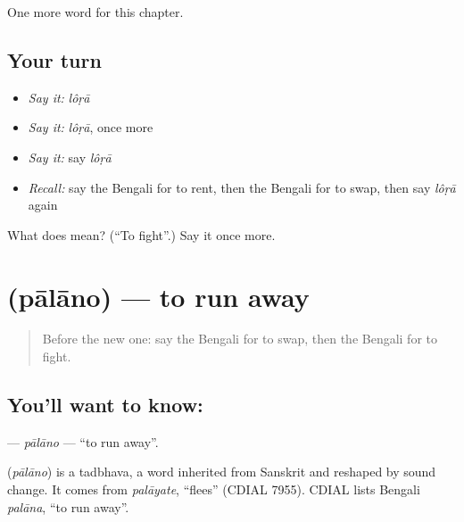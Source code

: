 \begin{grammarlens}[title={What you've built}]
One more word for this chapter.
\end{grammarlens}

\subsection*{Your turn}
\begin{itemize}
\raggedright
  \item \emph{Say it:} \emph{lôṛā}
  \item \emph{Say it:} \emph{lôṛā}, once more
  \item \emph{Say it:} say \emph{lôṛā}
  \item \emph{Recall:} say the Bengali for to rent, then the Bengali for to swap, then say \emph{lôṛā} again
\end{itemize}

\begin{tcolorbox}[breakable,colback=teal!4,colframe=teal!35!black,title={Before you move on}]
What does  mean? (\textquotedblleft{}To fight\textquotedblright{}.) Say it once more.
\end{tcolorbox}
\section[\texorpdfstring{\bn{পালানো} (pālāno)}{পালানো (pālāno)}]{ (pālāno) — to run away}

\label{lesson:BN-C212-palano}



\begin{quote}
Before the new one: say the Bengali for to swap, then the Bengali for to fight.
\end{quote}

\subsection*{You'll want to know: }
\textbf{} — \emph{pālāno} — \textquotedblleft{}to run away\textquotedblright{}.

\begin{cousinweb}
\textbf{} (\emph{pālāno}) is a tadbhava, a word inherited from Sanskrit and reshaped by sound change. It comes from \emph{palāyate}, \textquotedblleft{}flees\textquotedblright{} (CDIAL 7955). CDIAL lists Bengali \emph{palāna}, \textquotedblleft{}to run away\textquotedblright{}.
\end{cousinweb}


